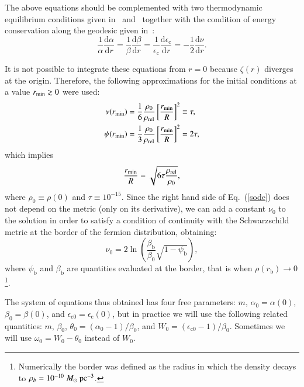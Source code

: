 \documentclass[twocolumn]{aa}
\begin{document}
The above equations should be complemented with two thermodynamic equilibrium conditions given
in~\citet{PhysRev.35.904} and~\citet{RevModPhys.21.531} together with the condition of energy conservation
along the geodesic given in~\citet{1989A&A...221....4M}:
\begin{equation}
   \frac{1}{\alpha}\frac{\mathrm{d}\alpha}{\mathrm{d}r}=\frac{1}{\beta}\frac{\mathrm{d}\beta}{\mathrm{d}r}=
   \frac{1}{\epsilon_\mathrm{c}}\frac{\mathrm{d}\epsilon_\mathrm{c}}{\mathrm{d}r}=-\frac{1}{2}\frac{\mathrm{d}\nu}{\mathrm{d}r}.
   \label{geod_energy}
\end{equation}

It is not possible to integrate these equations from $r=0$ because $\zeta(r)$ diverges at the origin. 
Therefore, the following approximations for the initial conditions at a value $r_{\rm{min}}\gtrsim 0$ were used:
\begin{align}
   \nu(r_{\rm{min}}) &= \frac{1}{6}\frac{\rho_0}{\rho_{\rm{rel}}}\left[\frac{r_{\rm{min}}}{R}\right]^2\equiv\tau, \\
   \psi(r_{\rm{min}})&= \frac{1}{3}\frac{\rho_0}{\rho_{\rm{rel}}}\left[\frac{r_{\rm{min}}}{R}\right]^2 = 2\tau,
\end{align}
which implies
\begin{equation}
   \frac{r_{\rm{min}}}{R}=\sqrt{6\tau\frac{\rho_{\rm{rel}}}{\rho_0}},
\end{equation}
where $\rho_0\equiv \rho(0)$ and $\tau\equiv 10^{-15}$.
Since the right hand side of Eq.~(\ref{sode}) does not depend on the metric (only on its derivative), we can add
a constant $\nu_0$ to the solution in order to satisfy a condition of continuity with the Schwarzschild metric at the border of the fermion distribution, obtaining:
\begin{equation}
\nu_0 = 2\ln\left(\frac{\beta_\mathrm{b}}{\beta_0}\sqrt{1-\psi_\mathrm{b}}\right),
\end{equation}
where $\psi_\mathrm{b}$ and $\beta_\mathrm{b}$ are quantities evaluated at the border, that is when 
$\rho(r_\mathrm{b})\rightarrow 0$\footnote{Numerically the border was defined as the radius in which
the density decays to $\rho_b=10^{-10}~M_\odot~\rm{pc}^{-3}$.}.

The system of equations thus obtained has four free parameters: $m$, $\alpha_0=\alpha(0)$,
$\beta_0=\beta(0)$, and $\epsilon_{\mathrm{c}0}=\epsilon_\mathrm{c}(0)$, but in practice we will use the following related
quantities:
$m$, $\beta_0$, $\theta_0=(\alpha_0-1)/\beta_0$, and $W_0=(\epsilon_{\mathrm{c}0}-1)/\beta_0$.
Sometimes we will use $\omega_0=W_0-\theta_0$ instead of $W_0$.
\end{document}
